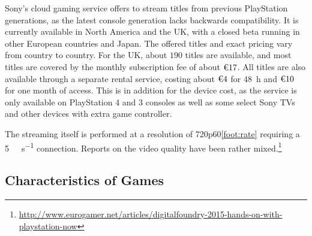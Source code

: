 Sony's cloud gaming service offers to stream titles from previous
PlayStation generations, as the latest console generation lacks
backwards compatibility. It is currently available in North America and
the UK, with a closed beta running in other European countries and
Japan. The offered titles and exact pricing vary from country to
country. For the UK, about $190$ titles are available, and most titles
are covered by the monthly subscription fee of about $\text{\texteuro}
17$. All titles are also available through a separate rental service,
costing about $\text{\texteuro} 4$ for \SI{48}{\hour} and
$\text{\texteuro} 10$ for one month of access. This is in addition for
the device cost, as the service is only available on PlayStation 4 and 3
consoles as well as some select Sony TVs and other devices with extra
game controller.


The streaming itself is performed at a resolution of
720p60\cref{foot:rate} requiring a \SI{5}{\mega\bit\per\second}
connection. Reports on the video quality have been rather
mixed.\footnote{\url{http://www.eurogamer.net/articles/digitalfoundry-2015-hands-on-with-playstation-now}}





\subsection{Characteristics of Games}

